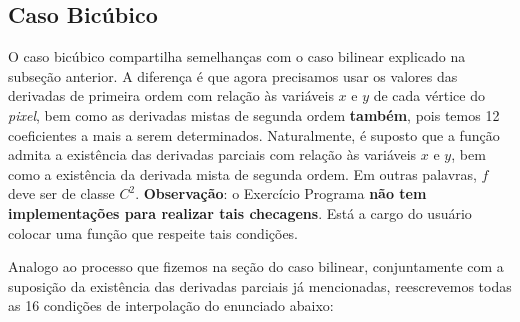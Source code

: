 \documentclass[11pt]{article}
\begin{document}
\subsection{Caso Bicúbico}

  \indent\indent O caso bicúbico compartilha semelhanças com o caso bilinear explicado
  na subseção anterior. A diferença é que agora precisamos usar os valores das derivadas
  de primeira ordem com relação às variáveis $x$ e $y$ de cada vértice do \textit{pixel},
  bem como as derivadas mistas de segunda ordem \textbf{também}, pois temos 12 coeficientes
  a mais a serem determinados. Naturalmente, é suposto que a função admita a existência
  das derivadas parciais com relação às variáveis $x$ e $y$, bem como a existência da
  derivada mista de segunda ordem. Em outras palavras, $f$ deve ser de classe $C^2$.
  \textbf{Observação}: o Exercício Programa \textbf{não tem implementações para realizar tais
  checagens}. Está a cargo do usuário colocar uma função que respeite tais condições.

  Analogo ao processo que fizemos na seção do caso bilinear, conjuntamente com a suposição
  da existência das derivadas parciais já mencionadas, reescrevemos todas as 16 condições de
  interpolação do enunciado abaixo:
\end{document}
